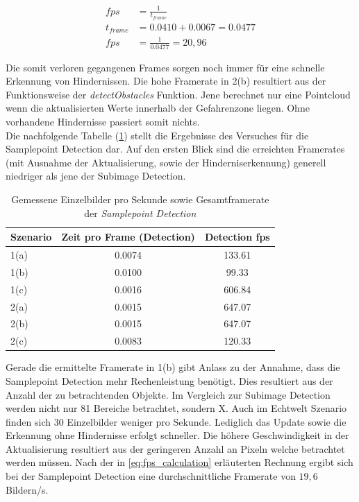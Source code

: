 \begin{equation}
\label{eq:fps_calculation}
\begin{aligned}
	fps &= \frac{1}{t_{frame}}\\
	t_{frame} &= 0.0410 + 0.0067 = 0.0477\\
	fps &= \frac{1}{0.0477} = 20,96
\end{aligned}
\end{equation}

\noindent
Die somit verloren gegangenen Frames sorgen noch immer für eine schnelle Erkennung von Hindernissen. Die hohe Framerate in 2(b) resultiert aus der Funktionsweise der \emph{detectObstacles} Funktion. Jene berechnet nur eine Pointcloud wenn die aktualisierten Werte innerhalb der Gefahrenzone liegen. Ohne vorhandene Hindernisse passiert somit nichts.\\

\noindent
Die nachfolgende Tabelle (\ref{tbl:samplepoint_framerate}) stellt die Ergebnisse des Versuches für die Samplepoint Detection dar. Auf den ersten Blick sind die erreichten Framerates (mit Ausnahme der Aktualisierung, sowie der Hinderniserkennung) generell niedriger als jene der Subimage Detection. 

\begin{table}[h]
\centering
\begin{tabular}{|l|c|c|}
\hline
Szenario & Zeit pro Frame (Detection) & Detection fps \\ \hline \hline
1(a)     & 0.0074           			  & 133.61        \\ \hline
1(b)     & 0.0100           			  & 99.33         \\ \hline
1(c)     & 0.0016           			  & 606.84        \\ \hline \hline
2(a)     & 0.0015           			  & 647.07        \\ \hline
2(b)     & 0.0015           		  	  & 647.07        \\ \hline
2(c)     & 0.0083           	 		  & 120.33        \\ \hline
\end{tabular}
\caption{Gemessene Einzelbilder pro Sekunde sowie Gesamtframerate der \emph{Samplepoint Detection}}
\label{tbl:samplepoint_framerate}
\end{table}

\noindent
Gerade die ermittelte Framerate in 1(b) gibt Anlass zu der Annahme, dass die Samplepoint Detection mehr Rechenleistung benötigt. Dies resultiert aus der Anzahl der zu betrachtenden Objekte. Im Vergleich zur Subimage Detection werden nicht nur 81 Bereiche betrachtet, sondern X. Auch im Echtwelt Szenario finden sich 30 Einzelbilder weniger pro Sekunde. Lediglich das Update sowie die Erkennung ohne Hindernisse erfolgt schneller. Die höhere Geschwindigkeit in der Aktualisierung resultiert aus der geringeren Anzahl an Pixeln welche betrachtet werden müssen. Nach der in \ref{eq:fps_calculation} erläuterten Rechnung ergibt sich bei der Samplepoint Detection eine durchschnittliche Framerate von $19,6$ Bildern/s.\\

